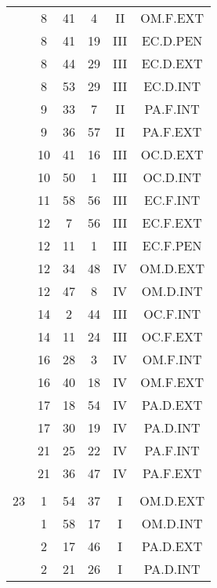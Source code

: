 \documentclass[12pt, a4paper]{article}
\begin{document}
\begin{multicols}{3}
{\begin{tabular}{c c c c c c}
	 	 	 	 & 8 & 41 & 4 & II & OM.F.EXT\\%
	 	 	 	 & 8 & 41 & 19 & III & EC.D.PEN\\%
	 	 	 	 & 8 & 44 & 29 & III & EC.D.EXT\\%
	 	 	 	 & 8 & 53 & 29 & III & EC.D.INT\\%
	 	 	 	 & 9 & 33 & 7 & II & PA.F.INT\\%
	 	 	 	 & 9 & 36 & 57 & II & PA.F.EXT\\%
	 	 	 	 & 10 & 41 & 16 & III & OC.D.EXT\\%
	 	 	 	 & 10 & 50 & 1 & III & OC.D.INT\\%
	 	 	 	 & 11 & 58 & 56 & III & EC.F.INT\\%
	 	 	 	 & 12 & 7 & 56 & III & EC.F.EXT\\%
	 	 	 	 & 12 & 11 & 1 & III & EC.F.PEN\\%
	 	 	 	 & 12 & 34 & 48 & IV & OM.D.EXT\\%
	 	 	 	 & 12 & 47 & 8 & IV & OM.D.INT\\%
	 	 	 	 & 14 & 2 & 44 & III & OC.F.INT\\%
	 	 	 	 & 14 & 11 & 24 & III & OC.F.EXT\\%
	 	 	 	 & 16 & 28 & 3 & IV & OM.F.INT\\%
	 	 	 	 & 16 & 40 & 18 & IV & OM.F.EXT\\%
	 	 	 	 & 17 & 18 & 54 & IV & PA.D.EXT\\%
	 	 	 	 & 17 & 30 & 19 & IV & PA.D.INT\\%
	 	 	 	 & 21 & 25 & 22 & IV & PA.F.INT\\%
	 	 	 	 & 21 & 36 & 47 & IV & PA.F.EXT\\%
	 	 	 	 & & & & & \\%
	 	 	 	23 & 1 & 54 & 37 & I & OM.D.EXT\\%
	 	 	 	 & 1 & 58 & 17 & I & OM.D.INT\\%
	 	 	 	 & 2 & 17 & 46 & I & PA.D.EXT\\%
	 	 	 	 & 2 & 21 & 26 & I & PA.D.INT\\%
	 	 \end{tabular}
 	}
\end{multicols}
\end{document}

